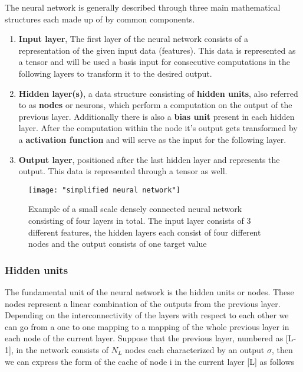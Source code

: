 \documentclass[12pt]{article}
\begin{document}
The neural network is generally described through three main mathematical structures each made up of by common components.\cite{Bishop2013, Haykin2008, Budumu, P.Murphy1991, TrevorHastie2009}
\begin{enumerate}
	\item \textbf{Input layer}, The first layer of the neural network consists of a representation of the given input data (features). This data is represented as a tensor and will be used a basis input for consecutive computations in the following layers to transform it to the desired output.
	\item \textbf{Hidden layer(s)}, a data structure consisting of \textbf{hidden units}, also referred to as \textbf{nodes} or neurons, which perform a computation on the output of the previous layer. Additionally there is also a \textbf{bias unit} present in each hidden layer. After the computation within the node it's output gets transformed by a \textbf{activation function} and will serve as the input for the following layer.
	\item \textbf{Output layer}, positioned after the last hidden layer and represents the output. This data is represented through a tensor as well.
\end{enumerate}
\begin{figure}[h]
	\centering
	\texttt{[image: "simplified neural network"]}
	\caption{Example of a small scale densely connected neural network consisting of four layers in total. The input layer consists of 3 different features, the hidden layers each consist of four different nodes and the output consists of one target value\cite{neuralnetwerkafbeelding}}
	\label{fig:structure}
\end{figure}

\subsubsection{Hidden units}

The fundamental unit of the neural network is the hidden units or nodes. These nodes represent a linear combination of the outputs from the previous layer. Depending on the interconnectivity of the layers with respect to each other we can go from a one to one mapping to a mapping of the whole previous layer in each node of the current layer. Suppose that the previous layer, numbered as [L-1], in the network consists of $N_L$ nodes each characterized by an output $\sigma$, then we can express the form of the cache of node i in the current layer [L] as follows\cite{Bishop2013}\cite{Goodfellow} 
\end{document}
